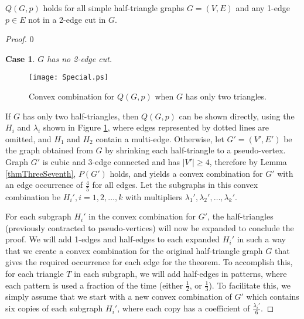\documentclass[oneeqnum,final]{siamltex1213}
\newtheorem{case}{Case}
\begin{document}
\begin{theorem}\label{mainThm}
$Q(G, p)$ holds for all simple half-triangle graphs $G=(V, E)$ and any 1-edge $p\in E$ not in a 2-edge cut in $G$.
\end{theorem}

\begin{proof}
\setcounter {case} {0}

\begin{case}\label{case1}
$G$ has no 2-edge cut.
\end{case}
\begin{figure}
\begin{center}
\texttt{[image: Special.ps]}
\end{center}
\caption{Convex combination for $Q(G, p)$ when $G$ has only two triangles.}
\label{SpecialCase}
\end{figure}
If $G$ has only two half-triangles, then $Q(G, p)$ can be shown directly, using the $H_{i}$ and $\lambda_{i}$ shown in Figure \ref{SpecialCase}, where edges represented by dotted lines are omitted, and $H_{1}$ and $H_{2}$ contain a multi-edge. Otherwise, let \mbox{$G'=(V', E')$} be the graph obtained from $G$ by shrinking each half-triangle to a pseudo-vertex. Graph $G'$ is cubic and 3-edge connected and has $|V'|\geq 4$, therefore by Lemma \ref{thmThreeSeventh}, $P(G')$ holds, and yields a convex combination for $G'$ with an edge occurrence of $\frac{4}{5}$ for all edges. Let the subgraphs in this convex combination be $H_{i}', i=1, 2, \ldots, k$ with multipliers $\lambda_{1}', \lambda_{2}', \ldots, \lambda_{k}'$.

For each subgraph $H_{i}'$ in the convex combination for $G'$, the half-triangles (previously contracted to pseudo-vertices) will now be expanded to conclude the proof. We will add 1-edges and half-edges to each expanded $H_{i}'$ in such a way that we create a convex combination for the original half-triangle graph $G$ that gives the required occurrence for each edge for the theorem. To accomplish this, for each triangle $T$ in each subgraph, we will add half-edges in patterns, where each pattern is used a fraction of the time (either $\frac{1}{2}$, or $\frac{1}{3}$). To facilitate this, we simply assume that we start with a new convex combination of $G'$ which contains six copies of each subgraph $H_{i}'$, where each copy has a coefficient of $\frac{\lambda_{i}'}{6}$. 


\end{proof}
\end{document}
